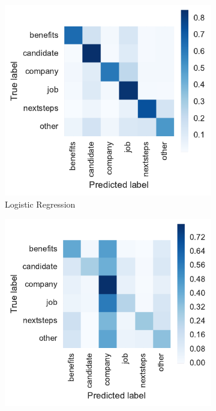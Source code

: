\begin{figure}[h]
    \centering
    \begin{subfigure}[b]{0.32\textwidth}
        \includegraphics[width=\textwidth]{img/exp-vector-space-conf-matrix-bom-logreg-normalized.pdf}
        \caption{Logistic Regression}
\label{fig:exp-vector-space-conf-matrix-bom-logreg-normalized}
    \end{subfigure}
    \begin{subfigure}[b]{0.32\textwidth}
        \includegraphics[width=\textwidth]{img/exp-vector-space-conf-matrix-bom-naivebayes-normalized.pdf}

\end{subfigure}
\end{figure}
